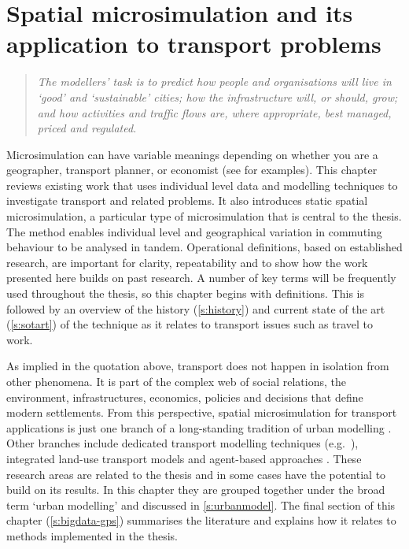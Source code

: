 \documentclass[a4paper, 11pt, twoside]{Thesis}
\begin{document}
 

\chapter{Spatial microsimulation and its application to transport problems}
\label{Chapter3}
\fancyhead[RE,LO]{\thepage}

\begin{quote}
\textit{The modellers' task is to predict how people and organisations will live
in
`good' and `sustainable' cities; how the infrastructure will, or should, grow;
and how activities and traffic flows are, where appropriate, best managed,
priced and regulated.}
\end{quote}

Microsimulation can have variable meanings depending on whether you are a
geographer, transport planner, or economist
(see \citealp{Ballas2005b, Liu2006, Bourguignon2006} for examples).
This chapter reviews existing work that uses individual level data and modelling
techniques to investigate transport and related problems.
It also introduces static spatial microsimulation, a particular type of
microsimulation that is central to the thesis. The method enables
individual level and geographical variation in commuting behaviour
to be analysed in tandem. Operational definitions, based on
established research, are important for clarity, repeatability and to
show how the work presented here builds on past research. A number of key terms will be
frequently used throughout the thesis, so this chapter begins with
definitions.
This is followed by an overview of the history (\cref{s:history}) and current
state of the art (\cref{s:sotart}) of the technique as it relates to transport
issues such as travel to work.

As implied in the quotation above, transport does not happen in isolation from
other phenomena. It is part of the complex web of social relations, the environment,
infrastructures, economics, policies and decisions
that define modern settlements. From this
perspective, spatial microsimulation for transport applications is just one
branch of a long-standing tradition of urban modelling
\citep{Wilson1970, batty1976urban, batty2007cities}.
Other branches include dedicated transport modelling techniques
(e.g.~\citealp{SATURN2012}), integrated land-use transport  models
\citep{Wegener2009} and agent-based approaches \citep{Gilbert2008-abm}.
These research areas are related to the thesis and in some cases have
the potential to build on its results. In this chapter they
are grouped together under the broad term `urban modelling' and
discussed in \cref{s:urbanmodel}. The final section of
this chapter (\cref{s:bigdata-gps}) summarises the literature and
explains how it relates to methods implemented in the thesis.
\end{document}
